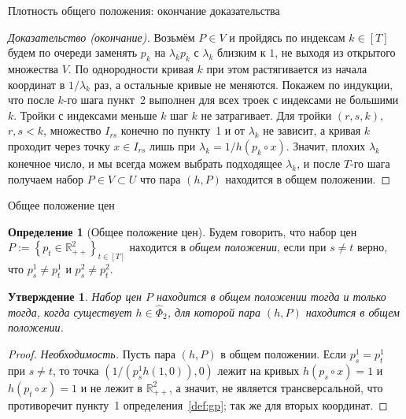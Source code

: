 \documentclass[10pt,aspectratio=169]{beamer}
\theoremstyle{plain}
\newtheorem{prop}{Утверждение}
\theoremstyle{definition}
\newtheorem{defn}{Определение}
\newcommand{\R}{\mathbb{R}}
\newcommand{\set}[1]{\left\{ #1 \right\}}
\newcommand{\Rpp}[1][2]{\R^{#1}_{++}}
\begin{document}
\begin{frame}{Плотность общего положения: окончание доказательства}
    \begin{proof}[Доказательство (окончание)]
        Возьмём $P\in V$ и пройдясь по индексам $k\in[T]$ будем по очереди заменять $p_k$ на $\lambda_kp_k$ с $\lambda_k$ близким к $1$, не выходя из открытого множества $V$. По однородности кривая $k$ при этом растягивается из начала координат в $1/\lambda_k$ раз, а остальные кривые не меняются. Покажем по индукции, что после $k$-го шага пункт~2 выполнен для всех троек с индексами не большими $k$. Тройки с индексами меньше $k$ шаг $k$ не затрагивает. Для тройки $(r,s,k)$, $r,s<k$, множество $I_{rs}$ конечно по пункту~1 и от $\lambda_k$ не зависит, а кривая $k$ проходит через точку $x\in I_{rs}$ лишь при $\lambda_k=1/h(p_k\circ x)$. Значит, плохих $\lambda_k$ конечное число, и мы всегда можем выбрать подходящее $\lambda_k$, и после $T$-го шага получаем набор $P\in V\subset U$ что пара $(h,P)$ находится в общем положении.
    \end{proof}
\end{frame}

\begin{frame}{Общее положение цен}
    \begin{defn}[Общее положение цен]\label{def:prices-gp}
        Будем говорить, что набор цен $P:=\set{p_t\in\Rpp}_{t\in[T]}$ находится в
        \textit{общем положении}, если при $s\neq t$ верно, что $p^{1}_{s}\neq p^{1}_{t}$ и $p^{2}_{s}\neq p^{2}_{t}$.
    \end{defn}

    \begin{prop}\label{prop:prices-gp}
        Набор цен $P$ находится в общем положении тогда и только тогда, когда существует $h\in\hat\Phi_{2}$, для которой пара $(h,P)$ находится в общем положении.
    \end{prop}

    \begin{proof}
        \emph{Необходимость.} Пусть пара $(h,P)$ в общем положении. Если $p^{1}_{s}=p^{1}_{t}$ при $s\ne t$, то точка $(1/(p^{1}_{s}h(1,0)),0)$ лежит на кривых $h(p_s\circ x)=1$ и $h(p_t\circ x)=1$ и не лежит в $\Rpp$, а значит, не является трансверсальной, что противоречит пункту~1 определения~\ref{def:gp}; так же для вторых координат.
    \end{proof}
\end{frame}
\end{document}
